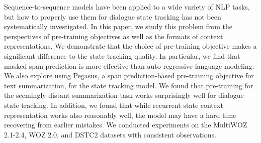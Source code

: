 Sequence-to-sequence models have been applied to a wide variety of NLP tasks, but how to properly use them for dialogue state tracking has not been systematically investigated. In this paper, we study this problem from the perspectives of pre-training objectives as well as the formats of context representations. We demonstrate that the choice of pre-training objective makes a significant difference to the state tracking quality. In particular, we find that masked span prediction is more effective than auto-regressive language modeling. We also explore using Pegasus, a span prediction-based pre-training objective for text summarization, for the state tracking model. We found that pre-training for the seemingly distant summarization task works surprisingly well for dialogue state tracking. In addition, we found that while recurrent state context representation works also reasonably well, the model may have a hard time recovering from earlier mistakes. We conducted experiments on the MultiWOZ 2.1-2.4, WOZ 2.0, and DSTC2 datasets with consistent observations.
